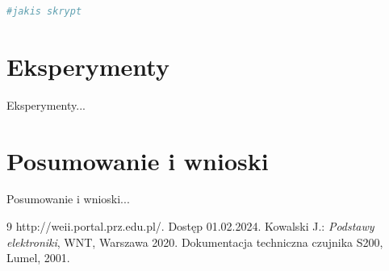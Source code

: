 \documentclass[12pt,oneside]{article}
\begin{document}
\begin{lstlisting}[language=Python, caption={Kod procesu wyboru 5 klas}, label={Kod:kopiowanie zdj}]
#jakis skrypt
\end{lstlisting}

\section{Eksperymenty}
Eksperymenty...
\section{Posumowanie i wnioski}
Posumowanie i wnioski...

\begin{thebibliography}{9}
     http://weii.portal.prz.edu.pl/. Dostęp 01.02.2024.
     Kowalski J.: \textit{Podstawy elektroniki}, WNT, Warszawa 2020.
     Dokumentacja techniczna czujnika S200, Lumel, 2001.
\end{thebibliography}
\end{document}
